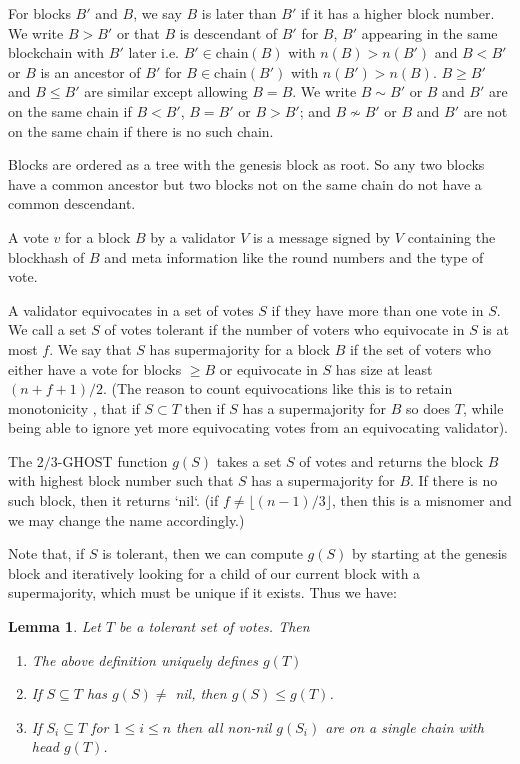 \documentclass{article}
\newtheorem{lemma}[theorem]{Lemma}
\begin{document}
For blocks $B'$ and $B$, we say $B$ is later than $B'$ if it has a higher block number.
We write $B > B'$ or that $B$ is descendant of $B'$ for $B$, $B'$ appearing in the same blockchain with $B'$ later i.e. $B' \in \mathrm{chain}(B)$ with $n(B) > n(B')$ and $B < B'$ or $B$ is an ancestor of $B'$ for $B \in \mathrm{chain}(B')$ with $n(B') > n(B)$.
$B \geq B'$ and $B \leq B'$ are similar except allowing $B = B$.
We write $B \sim B'$ or $B$ and $B'$ are on the same chain if $B<B'$, $B=B'$ or $B> B'$; and $B \nsim B'$ or $B$ and $B'$ are not on the same chain if there is no such chain.

Blocks are ordered as a tree with the genesis block as root. So any two blocks have a common ancestor but two blocks not on the same chain do not have a common descendant.

A vote $v$ for a block $B$ by a validator $V$ is a message signed by $V$ containing the blockhash of $B$ and meta information like the round numbers and the type of vote. 



A validator equivocates in a set of votes $S$ if they have more than one vote in $S$. We call a set $S$ of votes tolerant if the number of voters who equivocate in $S$ is at most $f$. We say that $S$ has supermajority for a block $B$ if the set of voters who either have a vote for blocks $\geq B$ or equivocate in $S$ has size at least $(n+f+1)/2$. (The reason to count equivocations like this is to retain monotonicity , that if $S \subset T$ then if $S$ has a supermajority for $B$ so does $T$, while being able to ignore yet more equivocating votes from an equivocating validator).

The $2/3$-GHOST function $g(S)$ takes a set $S$ of votes and returns the block $B$ with highest block number such that $S$ has a supermajority for $B$.
If there is no such block, then it returns `nil`. (if $f \neq \lfloor (n-1)/3 \rfloor$, then this is a misnomer and we may change the name accordingly.)

Note that, if $S$ is tolerant, then we can compute $g(S)$ by starting at the genesis block and iteratively looking for a child of our current block with a supermajority, which must be unique if it exists. Thus we have:
\begin{lemma} \label{lem:ghost-monotonicity}
Let $T$ be a tolerant set of votes. Then
\begin{enumerate}
\item The above definition uniquely defines $g(T)$
\item If $S \subseteq T$ has $g(S) \neq$ nil, then $g(S) \leq g(T)$.
\item If $S_i \subseteq T$ for $1 \leq i \leq n$ then all non-nil $g(S_i)$ are on a single chain with head $g(T)$.
\end{enumerate}

\end{lemma}
\end{document}
